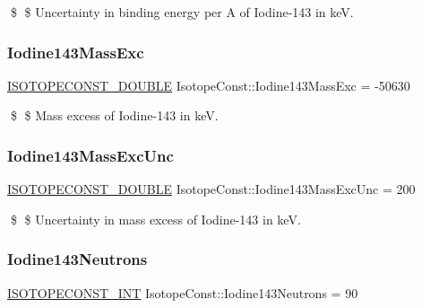 \$ \$ Uncertainty in binding energy per A of Iodine-\/143 in keV. \mbox{\label{group___isotope_const-_iodine-_i143_gab0eb3aa0450f5db68d636fcde1666d04}} 
\subsubsection{\texorpdfstring{Iodine143\+Mass\+Exc}{Iodine143MassExc}}
{\footnotesize\ttfamily \mbox{\hyperlink{group___isotope_const-_macros_ga8f45a7272ce02c0b4c65c44636ed719a}{I\+S\+O\+T\+O\+P\+E\+C\+O\+N\+S\+T\+\_\+\+D\+O\+U\+B\+LE}} Isotope\+Const\+::\+Iodine143\+Mass\+Exc = -\/50630}

\$ \$ Mass excess of Iodine-\/143 in keV. \mbox{\label{group___isotope_const-_iodine-_i143_gaae5f3f2be9e9cc6a2684ff46e3424ec2}} 
\subsubsection{\texorpdfstring{Iodine143\+Mass\+Exc\+Unc}{Iodine143MassExcUnc}}
{\footnotesize\ttfamily \mbox{\hyperlink{group___isotope_const-_macros_ga8f45a7272ce02c0b4c65c44636ed719a}{I\+S\+O\+T\+O\+P\+E\+C\+O\+N\+S\+T\+\_\+\+D\+O\+U\+B\+LE}} Isotope\+Const\+::\+Iodine143\+Mass\+Exc\+Unc = 200}

\$ \$ Uncertainty in mass excess of Iodine-\/143 in keV. \mbox{\label{group___isotope_const-_iodine-_i143_gaedf8064f888dabd589dab3fd32499357}} 
\subsubsection{\texorpdfstring{Iodine143\+Neutrons}{Iodine143Neutrons}}
{\footnotesize\ttfamily \mbox{\hyperlink{group___isotope_const-_macros_ga5f18360b3e99483a35c32d789e62621c}{I\+S\+O\+T\+O\+P\+E\+C\+O\+N\+S\+T\+\_\+\+I\+NT}} Isotope\+Const\+::\+Iodine143\+Neutrons = 90}

